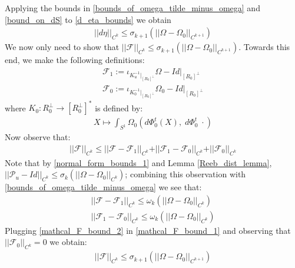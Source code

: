 \documentclass[11pt]{amsart}
\theoremstyle{plain}
\theoremstyle{definition}
\theoremstyle{remark}
\begin{document}
Applying the bounds in \eqref{bounds_of_omega_tilde_minus_omega} and \eqref{bound_on_dS} to \eqref{d_eta_bounds} we obtain
\begin{align}\label{nft_deta_bound_final}
\vert\vert d\eta\vert\vert_{C^k}    \leq \sigma_{k+1}(\vert\vert \Omega - \Omega_0\vert\vert_{C^{k+1}})
\end{align}
We now only need to show that $\vert \vert \mathcal{F}\vert\vert_{C^k} \leq \sigma_{k+1}(\vert\vert\Omega -\Omega_0\vert\vert_{C^{k+1}})$. Towards this end, we make the following definitions:
\begin{align}
    \mathcal{F}_1:= \iota_{K^{-1}_u|_{[R_0]^{\perp}}} \Omega -Id|_{[R_0]^{\perp}} \\\nonumber
    \mathcal{F}_0:= \iota_{K^{-1}_0|_{[R_0]^{\perp}}} \Omega_0 -Id|_{[R_0]^{\perp}}
\end{align}
where $K_0: R_0^{\perp} \rightarrow [R^{\perp}_{0}]^*$ is defined by:
\begin{align}
    X \mapsto \int_{S^1} \Omega_0(d\Phi^t_0 (X),\; d\Phi^t_0 \;\cdot)
\end{align}
Now observe that:
\begin{align}\label{mathcal_F_bound_1}
  \vert\vert\mathcal{F}\vert\vert_{C^k} \leq  \vert\vert\mathcal{F} -\mathcal{F}_1\vert\vert_{C^k}   + \vert\vert\mathcal{F}_1 -\mathcal{F}_0\vert\vert_{C^k} + \vert\vert\mathcal{F}_0\vert\vert_{C^k}
\end{align}
Note that by \eqref{normal_form_bounds_1} and Lemma \ref{Reeb_dist_lemma}, $\vert\vert\mathcal{P}_u -Id\vert\vert_{C^k} \leq \sigma_k(\vert\vert\Omega- \Omega_0\vert\vert_{C^k})$; combining this observation with \eqref{bounds_of_omega_tilde_minus_omega} we see that:
\begin{align}\label{mathcal_F_bound_2}
    \vert\vert\mathcal{F} -\mathcal{F}_1\vert\vert_{C^k} \leq \omega_k(\vert\vert\Omega- \Omega_0\vert\vert_{C^{k}})  \\\nonumber \vert\vert\mathcal{F}_1 -\mathcal{F}_0\vert\vert_{C^k} \leq \omega_k(\vert\vert\Omega- \Omega_0\vert\vert_{C^k})
\end{align}
Plugging \eqref{mathcal_F_bound_2} in \eqref{mathcal_F_bound_1} and observing that $\vert\vert \mathcal{F}_0\vert\vert_{C^k} = 0$ we obtain:
\begin{align}
    \vert\vert\mathcal{F}\vert\vert_{C^k}  \leq \sigma_{k+1}(\vert\vert\Omega- \Omega_0\vert\vert_{C^{k+1}})
\end{align}
\end{document}
